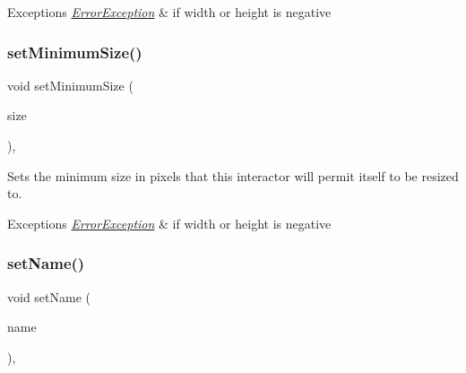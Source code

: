\begin{DoxyExceptions}{Exceptions}
{\em \mbox{\hyperlink{classErrorException}{Error\+Exception}}} & if width or height is negative \\
\hline
\end{DoxyExceptions}
\mbox{\label{classGInteractor_a3b1046117ac6cb7abe467e00ba8a81f4}} 
\subsubsection{\texorpdfstring{set\+Minimum\+Size()}{setMinimumSize()}\hspace{0.1cm}{\footnotesize\ttfamily [2/2]}}
{\footnotesize\ttfamily void set\+Minimum\+Size (\begin{DoxyParamCaption}\item[{const \mbox{\hyperlink{classGDimension}{G\+Dimension}} \&}]{size }\end{DoxyParamCaption})\hspace{0.3cm}{\ttfamily [virtual]}, {\ttfamily [inherited]}}



Sets the minimum size in pixels that this interactor will permit itself to be resized to. 


\begin{DoxyExceptions}{Exceptions}
{\em \mbox{\hyperlink{classErrorException}{Error\+Exception}}} & if width or height is negative \\
\hline
\end{DoxyExceptions}
\mbox{\label{classGInteractor_a9d3a2685df23b5e7cbf59c19c4a1f9b5}} 
\subsubsection{\texorpdfstring{set\+Name()}{setName()}}
{\footnotesize\ttfamily void set\+Name (\begin{DoxyParamCaption}\item[{const std\+::string \&}]{name }\end{DoxyParamCaption})\hspace{0.3cm}{\ttfamily [virtual]}, {\ttfamily [inherited]}}



